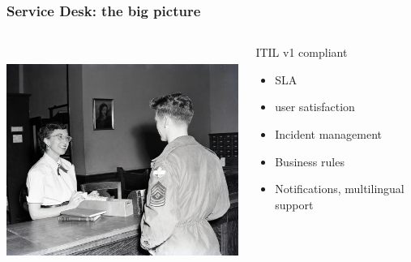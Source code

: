 \documentclass{beamer}
\begin{document}
\begin{frame}


    \frametitle{Service Desk: the big picture}
 \begin{columns}
 \begin{column}{0.45\textwidth}
         \includegraphics[height=7.5cm]{./pics/servicedesk.jpg}
 \end{column}
 \begin{column}{0.45\textwidth}
    \begin{block}{ITIL v1 compliant}
        \begin{itemize}
            \item SLA
            \item user satisfaction
            \item Incident management
            \item Business rules
            \item Notifications, multilingual support
        \end{itemize}

    \end{block}
   
 \end{column}
\end{columns}
\end{frame}
\end{document}
